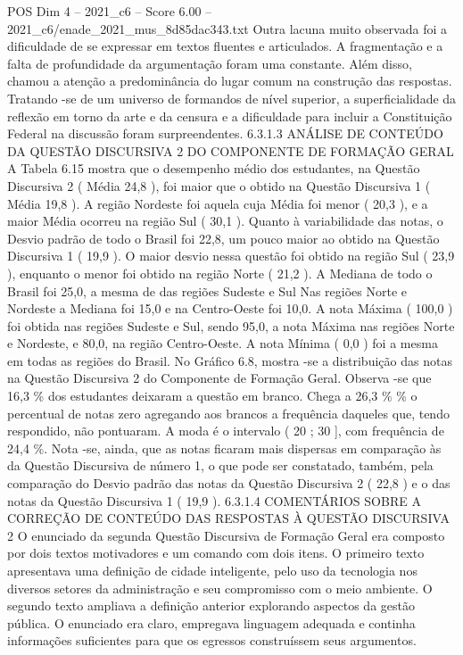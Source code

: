 \begin{textsample}{POS Dim 4 – 2021\_c6 – Score 6.00 – 2021\_c6/enade\_2021\_mus\_8d85dac343.txt}
Outra lacuna muito observada foi a dificuldade de se expressar em textos fluentes e articulados.
A fragmentação e a falta de profundidade da argumentação foram uma constante.
Além disso, chamou a atenção a predominância do lugar comum na construção das respostas.
Tratando -se de um universo de formandos de nível superior, a superficialidade da reflexão em torno da arte e da censura e a dificuldade para incluir a Constituição Federal na discussão foram surpreendentes. 6.3.1.3 ANÁLISE DE CONTEÚDO DA QUESTÃO DISCURSIVA 2 DO COMPONENTE DE FORMAÇÃO GERAL A Tabela 6.15 mostra que o desempenho médio dos estudantes, na Questão Discursiva 2 ( Média 24,8 ), foi maior que o obtido na Questão Discursiva 1 ( Média 19,8 ).
A região Nordeste foi aquela cuja Média foi menor ( 20,3 ), e a maior Média ocorreu na região Sul ( 30,1 ).
Quanto à variabilidade das notas, o Desvio padrão de todo o Brasil foi 22,8, um pouco maior ao obtido na Questão Discursiva 1 ( 19,9 ).
O maior desvio nessa questão foi obtido na região Sul ( 23,9 ), enquanto o menor foi obtido na região Norte ( 21,2 ).
A Mediana de todo o Brasil foi 25,0, a mesma de das regiões Sudeste e Sul Nas regiões Norte e Nordeste a Mediana foi 15,0 e na Centro-Oeste foi 10,0.
A nota Máxima ( 100,0 ) foi obtida nas regiões Sudeste e Sul, sendo 95,0, a nota Máxima nas regiões Norte e Nordeste, e 80,0, na região Centro-Oeste.
A nota Mínima ( 0,0 ) foi a mesma em todas as regiões do Brasil.
No Gráfico 6.8, mostra -se a distribuição das notas na Questão Discursiva 2 do Componente de Formação Geral.
Observa -se que 16,3 \% dos estudantes deixaram a questão em branco.
Chega a 26,3 \% \% o percentual de notas zero agregando aos brancos a frequência daqueles que, tendo respondido, não pontuaram.
A moda é o intervalo ( 20 ; 30 ], com frequência de 24,4 \%.
Nota -se, ainda, que as notas ficaram mais dispersas em comparação às da Questão Discursiva de número 1, o que pode ser constatado, também, pela comparação do Desvio padrão das notas da Questão Discursiva 2 ( 22,8 ) e o das notas da Questão Discursiva 1 ( 19,9 ). 6.3.1.4 COMENTÁRIOS SOBRE A CORREÇÃO DE CONTEÚDO DAS RESPOSTAS À QUESTÃO DISCURSIVA 2 O enunciado da segunda Questão Discursiva de Formação Geral era composto por dois textos motivadores e um comando com dois itens.
O primeiro texto apresentava uma definição de cidade inteligente, pelo uso da tecnologia nos diversos setores da administração e seu compromisso com o meio ambiente.
O segundo texto ampliava a definição anterior explorando aspectos da gestão pública.
O enunciado era claro, empregava linguagem adequada e continha informações suficientes para que os egressos construíssem seus argumentos.

\end{textsample}

